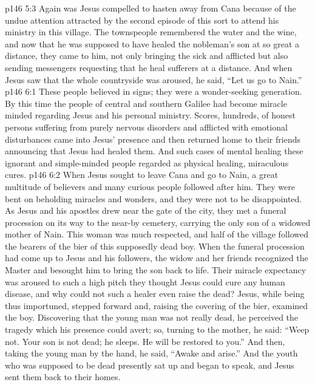 \vs p146 5:3 Again was Jesus compelled to hasten away from Cana because of the undue attention attracted by the second episode of this sort to attend his ministry in this village. The townspeople remembered the water and the wine, and now that he was supposed to have healed the nobleman’s son at so great a distance, they came to him, not only bringing the sick and afflicted but also sending messengers requesting that he heal sufferers at a distance. And when Jesus saw that the whole countryside was aroused, he said, \textcolor{ubdarkred}{“Let us go to Nain.”}
\vs p146 6:1 These people believed in signs; they were a wonder\hyp{}seeking generation. By this time the people of central and southern Galilee had become miracle minded regarding Jesus and his personal ministry. Scores, hundreds, of honest persons suffering from purely nervous disorders and afflicted with emotional disturbances came into Jesus’ presence and then returned home to their friends announcing that Jesus had healed them. And such cases of mental healing these ignorant and simple\hyp{}minded people regarded as physical healing, miraculous cures.
\pc \vs p146 6:2 When Jesus sought to leave Cana and go to Nain, a great multitude of believers and many curious people followed after him. They were bent on beholding miracles and wonders, and they were not to be disappointed. As Jesus and his apostles drew near the gate of the city, they met a funeral procession on its way to the near\hyp{}by cemetery, carrying the only son of a widowed mother of Nain. This woman was much respected, and half of the village followed the bearers of the bier of this supposedly dead boy. When the funeral procession had come up to Jesus and his followers, the widow and her friends recognized the Master and besought him to bring the son back to life. Their miracle expectancy was aroused to such a high pitch they thought Jesus could cure any human disease, and why could not such a healer even raise the dead? Jesus, while being thus importuned, stepped forward and, raising the covering of the bier, examined the boy. Discovering that the young man was not really dead, he perceived the tragedy which his presence could avert; so, turning to the mother, he said: \textcolor{ubdarkred}{“Weep not. Your son is not dead; he sleeps. He will be restored to you.”} And then, taking the young man by the hand, he said, \textcolor{ubdarkred}{“Awake and arise.”} And the youth who was supposed to be dead presently sat up and began to speak, and Jesus sent them back to their homes.
